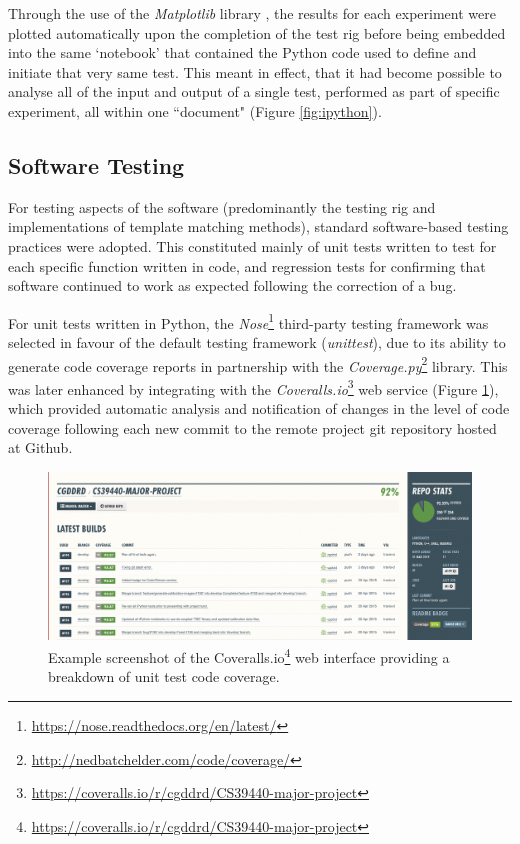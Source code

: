 Through the use of the \textit{Matplotlib} library \cite{matplotlib}, the results for each experiment were plotted automatically upon the completion of the test rig before being embedded into the same `notebook' that contained the Python code used to define and initiate that very same test. This meant in effect, that it had become possible to analyse all of the input and output of a single test, performed as part of specific experiment, all within one ``document" (Figure \ref{fig:ipython}).

\subsection{Software Testing}

For testing aspects of the software (predominantly the testing rig and implementations of template matching methods), standard software-based testing practices were adopted. This constituted mainly of unit tests written to test for each specific function written in code, and regression tests for confirming that software continued to work as expected following the correction of a bug.

For unit tests written in Python, the \textit{Nose}\footnote{\url{https://nose.readthedocs.org/en/latest/}} third-party testing framework was selected in favour of the default testing framework (\textit{unittest}), due to its ability to generate code coverage reports in partnership with the \textit{Coverage.py}\footnote{\url{http://nedbatchelder.com/code/coverage/}} library. This was later enhanced by integrating with the \textit{Coveralls.io}\footnote{\url{https://coveralls.io/r/cgddrd/CS39440-major-project}} web service (Figure \ref{fig:coveralls}), which provided automatic analysis and notification of changes in the level of code coverage following each new commit to the remote project git repository hosted at Github.

\begin{figure}[ht!]
\centering
\includegraphics[scale=0.28]{images/coveralls.png}
  \caption{Example screenshot of the Coveralls.io\footnote{\url{https://coveralls.io/r/cgddrd/CS39440-major-project}} web interface providing a breakdown of unit test code coverage.}
     \label{fig:coveralls}
\end{figure} 

